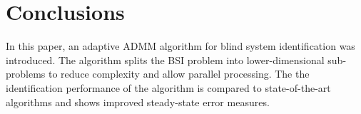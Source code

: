 \documentclass{article}
\begin{document}
\section{Conclusions}
\label{sec:conclusion}
In this paper, an adaptive ADMM algorithm for blind system identification was introduced.
The algorithm splits the BSI problem into lower-dimensional sub-problems to reduce complexity and allow parallel processing.
The the identification performance of the algorithm is compared to state-of-the-art algorithms and shows improved steady-state error measures.



\end{document}
